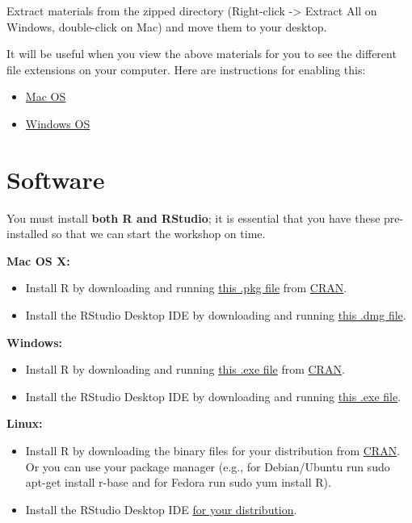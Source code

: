 \documentclass[
]{book}
\providecommand{\tightlist}{%
  \setlength{\itemsep}{0pt}\setlength{\parskip}{0pt}}
\begin{document}
Extract materials from the zipped directory (Right-click -\textgreater{} Extract All on Windows, double-click on Mac) and move them to your desktop.

It will be useful when you view the above materials for you to see the different file extensions on your computer. Here are instructions for enabling this:

\begin{itemize}
\tightlist
\item
  \href{https://support.apple.com/guide/mac-help/show-or-hide-filename-extensions-on-mac-mchlp2304/mac}{Mac OS}
\item
  \href{http://kb.winzip.com/kb/entry/26/}{Windows OS}
\end{itemize}

\hypertarget{software}{%
\section{Software}\label{software}}

You must install \textbf{both R and RStudio}; it is essential that you have these pre-installed so that we can start the workshop on time.

\textbf{Mac OS X:}

\begin{itemize}
\tightlist
\item
  Install R by downloading and running \href{http://cran.r-project.org/bin/macosx/R-latest.pkg}{this .pkg file} from \href{http://cran.r-project.org/index.html}{CRAN}.
\item
  Install the RStudio Desktop IDE by downloading and running \href{https://download1.rstudio.org/desktop/macos/RStudio-1.2.5033.dmg}{this .dmg file}.
\end{itemize}

\textbf{Windows:}

\begin{itemize}
\tightlist
\item
  Install R by downloading and running \href{https://cran.r-project.org/bin/windows/base/release.htm}{this .exe file} from \href{http://cran.r-project.org/index.html}{CRAN}.
\item
  Install the RStudio Desktop IDE by downloading and running \href{https://download1.rstudio.org/desktop/windows/RStudio-1.2.5033.exe}{this .exe file}.
\end{itemize}

\textbf{Linux:}

\begin{itemize}
\tightlist
\item
  Install R by downloading the binary files for your distribution from \href{http://cran.r-project.org/index.html}{CRAN}. Or you can use your package manager (e.g., for Debian/Ubuntu run sudo apt-get install r-base and for Fedora run sudo yum install R).
\item
  Install the RStudio Desktop IDE \href{https://rstudio.com/products/rstudio/download/\#download}{for your distribution}.
\end{itemize}
\end{document}
